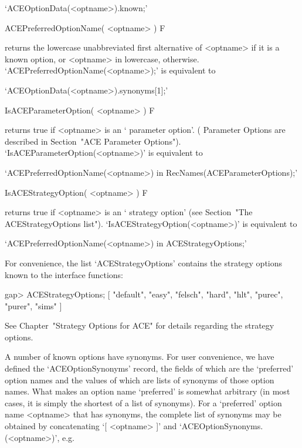 \beginitems
\qquad`ACEOptionData(<optname>).known;'
\enditems

\>ACEPreferredOptionName( <optname> ) F

returns the lowercase unabbreviated first alternative of <optname>  if
it is a known {\ACE} option, or  <optname>  in  lowercase,  otherwise.
`ACEPreferredOptionName(<optname>);' is equivalent to

\beginitems
\qquad`ACEOptionData(<optname>).synonyms[1];'
\enditems

\>IsACEParameterOption( <optname> ) F

returns true if <optname> is an \lq{}{\ACE} parameter option'. ({\ACE}
Parameter Options are described in Section~"ACE  Parameter  Options").
`IsACEParameterOption(<optname>)' is equivalent to

\beginitems
\qquad`ACEPreferredOptionName(<optname>) in RecNames(ACEParameterOptions);'
\enditems

\>IsACEStrategyOption( <optname> ) F

returns true if <optname> is  an  \lq{}{\ACE}  strategy  option'  (see
Section~"The                ACEStrategyOptions                 list").
`IsACEStrategyOption(<optname>)' is equivalent to

\beginitems
\qquad`ACEPreferredOptionName(<optname>) in ACEStrategyOptions;'
\enditems

\enditems


For  convenience,  the  {\GAP}  list  `ACEStrategyOptions'{\undoquotes
{}}   contains    the
strategy options known to the {\ACE} interface functions:

\beginexample
gap> ACEStrategyOptions;
[ "default", "easy", "felsch", "hard", "hlt", "purec", "purer", "sims" ]
\endexample

See Chapter~"Strategy Options  for  ACE"  for  details  regarding  the
{\ACE} strategy options.


A number of known {\ACE} options have synonyms. For user  convenience,
we     have      defined      the      `ACEOptionSynonyms'{\undoquotes
{}} record, the  fields
of which are the \lq{}preferred' option names and the values of  which
are lists of synonyms of those option names. What makes an option name
\lq{}preferred' is somewhat arbitrary (in most cases, it is simply the
shortest of a list of synonyms). For  a  \lq{}preferred'  option  name
<optname> that has synonyms, the complete  list  of  synonyms  may  be
obtained     by     concatenating     `[     <optname>     ]'      and
`ACEOptionSynonyms.(<optname>)', e.g.


